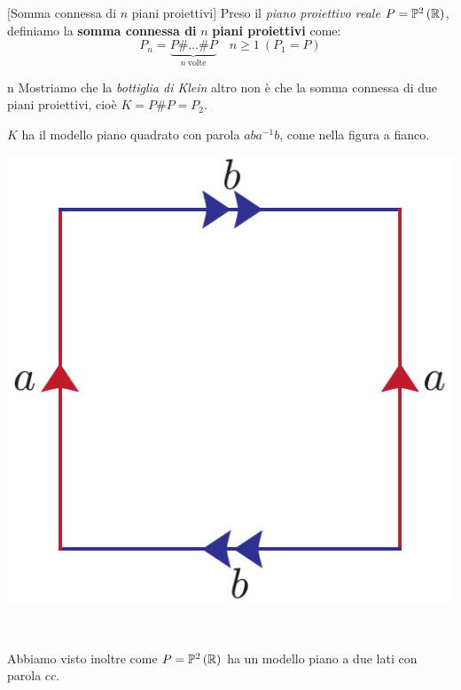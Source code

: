 \begin{definition}{}[Somma connessa di $n$ piani proiettivi]
	Preso il \textit{piano proiettivo reale} $P=\mathbb{P}^2\left(\mathbb{R}\right)$, definiamo la \textbf{somma connessa di} $n$ \textbf{piani proiettivi} come:
	\begin{equation*}
		P_n=\underbrace{P\# \ldots\# P}_{n\ \text{volte}}\quad n\geq 1\ \left(P_1=P\right)
	\end{equation*}
\end{definition}
\begin{remark}{n}
	Mostriamo che la \textit{bottiglia di Klein} altro non è che la somma connessa di due piani proiettivi, cioè $K=P\# P=P_2$.\\
	\begin{minipage}{.75\linewidth}
		$K$ ha il modello piano quadrato con parola $aba^{-1}b$, come nella figura a fianco.
	\end{minipage}
	\begin{minipage}{.24\linewidth}
		\begin{center}
			\includegraphics[trim=0cm 0cm 0cm 0cm, clip, scale=0.3]{images/klein.pdf}
		\end{center}
	\end{minipage}\\
	\begin{minipage}{.75\linewidth}
	Abbiamo visto inoltre come $P=\mathbb{P}^2\left(\mathbb{R}\right)$ ha un modello piano a due lati con parola $cc$.

\end{minipage}
\end{remark}

